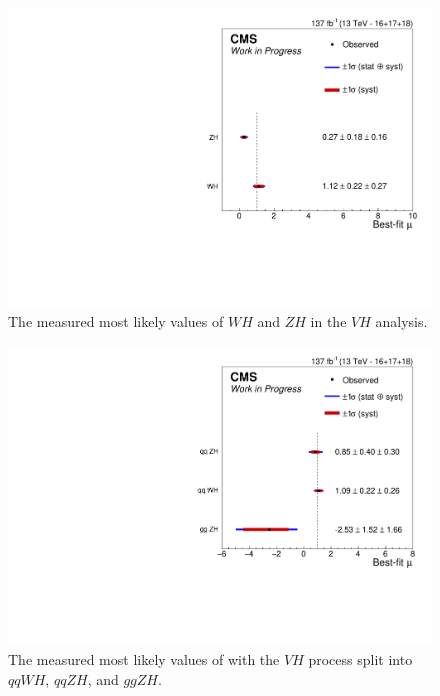 \begin{figure}
  \centering
  \includegraphics[width=0.8\linewidth]{figures/210309_vh_unblinded_Xbb_8f854f5a_a866aef8/summary_stxs.pdf}
  \caption[Measured values of $W\!H$ and $Z\!H$]{
    The measured most likely values of $W\!H$ and $Z\!H$ in the
    $V\!H$ analysis.
  }
  \label{fig:vh-whzh}
\end{figure}

\begin{figure}
  \centering
  \includegraphics[width=0.8\linewidth]{figures/210413_perproc_unblinded_Xbb_c215af6f_48193845/summary_stxs.pdf}
  \caption[Measured values of $qqW\!H$, $qqZ\!H$, and $ggZ\!H$]{
    The measured most likely values of with the $V\!H$ process split into
    $qqW\!H$, $qqZ\!H$, and $ggZ\!H$.
  }
  \label{fig:vh-ggzh}
\end{figure}


